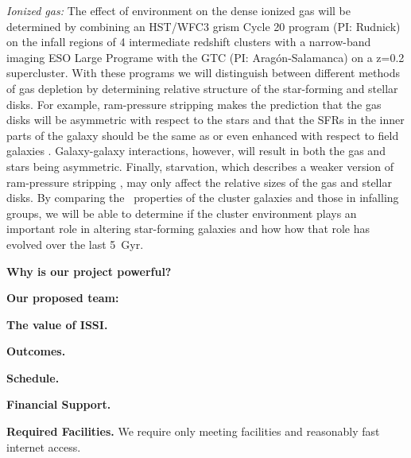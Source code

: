 \documentclass[11pt]{article}
\begin{document}
\textit{Ionized gas:} The effect of environment on the dense ionized
gas will be determined by combining an HST/WFC3 grism Cycle 20 program
(PI: Rudnick) on the infall regions of 4 intermediate redshift
clusters with a narrow-band imaging ESO Large Programe with the GTC
(PI: Arag\'on-Salamanca) on a z=0.2 supercluster.  With these programs
we will distinguish between different methods of gas depletion by
determining relative structure of the star-forming and stellar disks.
For example, ram-pressure stripping makes the prediction that the gas
disks will be asymmetric \citep[e.g.][]{Quilis00,Crowl05} with respect
to the stars and that the SFRs in the inner parts of the galaxy should
be the same as or even enhanced with respect to field galaxies
\citep{Koopmann04,Weinmann10}.  Galaxy-galaxy interactions, however,
will result in both the gas and stars being asymmetric.  Finally,
starvation, which describes a weaker version of ram-pressure stripping
\citep[e.g.][]{Larson80}, may only affect the relative sizes of the
gas and stellar disks.  By comparing the \ha\ properties of the
cluster galaxies and those in infalling groups, we will be able to
determine if the cluster environment plays an important role in
altering star-forming galaxies and how how that role has evolved over
the last 5~Gyr.

\textbf{Why is our project powerful?}  

\textbf{Our proposed team:} 

\textbf{The value of ISSI.}  

\textbf{Outcomes.}  

\textbf{Schedule.} 

\textbf{Financial Support.}  

\textbf{Required Facilities.}  We require only meeting facilities and
reasonably fast internet access.

\end{document}
